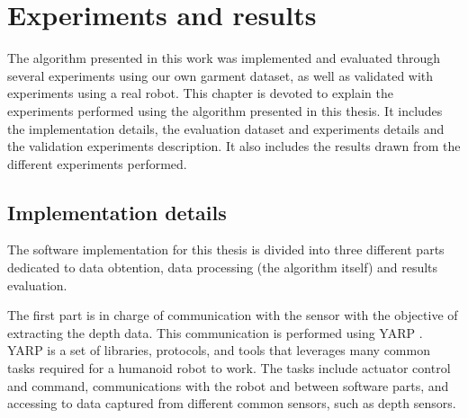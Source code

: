 \chapter{Experiments and results}
\label{experiments_and_results}

The algorithm presented in this work was implemented and evaluated through several experiments using our own garment dataset, as well as validated with experiments using a real robot. This chapter is devoted to explain the experiments performed using the algorithm presented in this thesis. It includes the implementation details, the evaluation dataset and experiments details and the validation experiments description. It also includes the results drawn from the different experiments performed.

\section{Implementation details}
\label{experiments:implementation}
The software implementation for this thesis is divided into three different parts dedicated to data obtention, data processing (the algorithm itself) and results evaluation. 

The first part is in charge of communication with the sensor with the objective of extracting the depth data. This communication is performed using YARP \cite{metta2006yarp}. YARP is a set of libraries, protocols, and tools that leverages many common tasks required for a humanoid robot to work. The tasks include actuator control and command, communications with the robot and between software parts, and accessing to data captured from different common sensors, such as depth sensors.

